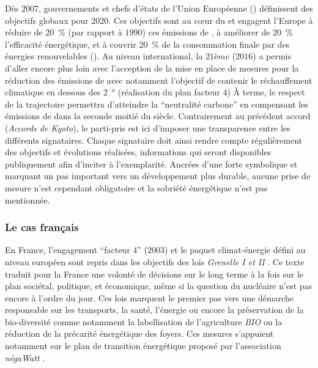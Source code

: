 Dès $2007$, gouvernements et chefs d’états de l’Union Européenne
() définissent des objectifs globaux pour $2020$. Ces objectifs sont au cœur du
et engagent l’Europe à réduire de \SI{20}{\percent} (par rapport à $1990$) ces
émissions de , à améliorer de \SI{20}{\percent} l’efficacité énergétique, et à
couvrir \SI{20}{\percent} de la consommation finale par des énergies renouvelables
(). Au niveau international, la $21ème$  ($2016$) a permis d’aller
encore plus loin avec l’acception de la mise en place de mesures pour la réduction des
émissions de  avec notamment l’objectif de contenir le réchauffement climatique
en dessous des \SI{2}{\degree} (réalisation du plan facteur $4$) À terme, le respect de la trajectoire
permettra d’atteindre la \enquote{neutralité carbone} en compensant les émissions de
 dans la seconde moitié du siècle. Contrairement au précédent accord
(\textit{Accords de Kyoto}), le parti-pris est ici d’imposer une transparence entre les
différents signataires. Chaque signataire doit ainsi rendre compte régulièrement des
objectifs et évolutions réalisées, informations qui seront disponibles publiquement afin
d’inciter à l’exemplarité. Ancrées d’une forte symbolique et marquant un pas important vers
un développement plus durable, aucune prise de mesure n’est cependant obligatoire et
la sobriété énergétique n’est pas mentionnée.


\subsubsection{Le cas français} %
\label{ssub:le_cas_francais}
En France, l’engagement \enquote{facteur 4} ($2003$) et le paquet climat-énergie défini
au niveau européen sont repris dans les objectifs des lois \textit{Grenelle I et II}
\parencite{Grenelle2010}. Ce texte traduit pour la France une volonté de décisions sur le
long terme à la fois sur le plan sociétal, politique, et économique, même si la question
du nucléaire n’est pas encore à l’ordre du jour. Ces lois marquent le premier pas vers une
démarche responsable sur les transports, la santé, l’énergie ou encore la préservation de
la bio-diversité comme notamment la labellisation de l’agriculture \emph{BIO} ou la
réduction de la précarité énergétique des foyers. Ces mesures s’appuient notamment sur le
plan de transition énergétique proposé par l’association \textit{négaWatt}
\parencite{Salomon2012}.

